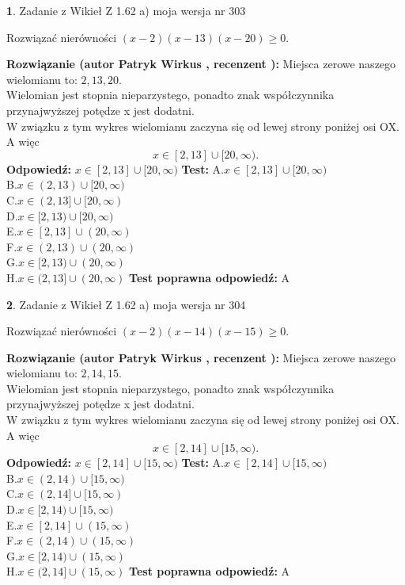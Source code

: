 \documentclass[12pt, a4paper]{article}
\theoremstyle{definition} %
\newtheorem{zad}{}
\newcommand{\zadStart}[1]{\begin{zad}#1\newline}
\newcommand{\zadStop}{\end{zad}}
\newcommand{\rozwStart}[2]{\noindent \textbf{Rozwiązanie (autor #1 , recenzent #2): }\newline}
\newcommand{\rozwStop}{\newline}
\newcommand{\odpStart}{\noindent \textbf{Odpowiedź:}\newline}
\newcommand{\odpStop}{\newline}
\newcommand{\testStart}{\noindent \textbf{Test:}\newline}
\newcommand{\testStop}{\newline}
\newcommand{\kluczStart}{\noindent \textbf{Test poprawna odpowiedź:}\newline}
\newcommand{\kluczStop}{\newline}
\begin{document}
\zadStart{Zadanie z Wikieł Z 1.62 a) moja wersja nr 303}

Rozwiązać nierówności $(x-2)(x-13)(x-20)\ge0$.
\zadStop
\rozwStart{Patryk Wirkus}{}
Miejsca zerowe naszego wielomianu to: $2, 13, 20$.\\
Wielomian jest stopnia nieparzystego, ponadto znak współczynnika przy\linebreak najwyższej potędze x jest dodatni.\\ W związku z tym wykres wielomianu zaczyna się od lewej strony poniżej osi OX. A więc $$x \in [2,13] \cup [20,\infty).$$
\rozwStop
\odpStart
$x \in [2,13] \cup [20,\infty)$
\odpStop
\testStart
A.$x \in [2,13] \cup [20,\infty)$\\
B.$x \in (2,13) \cup [20,\infty)$\\
C.$x \in (2,13] \cup [20,\infty)$\\
D.$x \in [2,13) \cup [20,\infty)$\\
E.$x \in [2,13] \cup (20,\infty)$\\
F.$x \in (2,13) \cup (20,\infty)$\\
G.$x \in [2,13) \cup (20,\infty)$\\
H.$x \in (2,13] \cup (20,\infty)$
\testStop
\kluczStart
A
\kluczStop



\zadStart{Zadanie z Wikieł Z 1.62 a) moja wersja nr 304}

Rozwiązać nierówności $(x-2)(x-14)(x-15)\ge0$.
\zadStop
\rozwStart{Patryk Wirkus}{}
Miejsca zerowe naszego wielomianu to: $2, 14, 15$.\\
Wielomian jest stopnia nieparzystego, ponadto znak współczynnika przy\linebreak najwyższej potędze x jest dodatni.\\ W związku z tym wykres wielomianu zaczyna się od lewej strony poniżej osi OX. A więc $$x \in [2,14] \cup [15,\infty).$$
\rozwStop
\odpStart
$x \in [2,14] \cup [15,\infty)$
\odpStop
\testStart
A.$x \in [2,14] \cup [15,\infty)$\\
B.$x \in (2,14) \cup [15,\infty)$\\
C.$x \in (2,14] \cup [15,\infty)$\\
D.$x \in [2,14) \cup [15,\infty)$\\
E.$x \in [2,14] \cup (15,\infty)$\\
F.$x \in (2,14) \cup (15,\infty)$\\
G.$x \in [2,14) \cup (15,\infty)$\\
H.$x \in (2,14] \cup (15,\infty)$
\testStop
\kluczStart
A
\kluczStop
\end{document}
